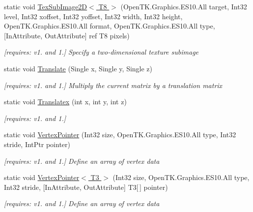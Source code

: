 \begin{DoxyCompactItemize}
static void \hyperlink{class_open_t_k_1_1_graphics_1_1_e_s10_1_1_g_l_a444f65140e204990399aab9eff034486}{Tex\-Sub\-Image2\-D$<$ T8 $>$} (Open\-T\-K.\-Graphics.\-E\-S10.\-All target, Int32 level, Int32 xoffset, Int32 yoffset, Int32 width, Int32 height, Open\-T\-K.\-Graphics.\-E\-S10.\-All format, Open\-T\-K.\-Graphics.\-E\-S10.\-All type, \mbox{[}In\-Attribute, Out\-Attribute\mbox{]} ref T8 pixels)
\begin{DoxyCompactList}\small\item\em \mbox{[}requires\-: v1. and 1.\mbox{]} Specify a two-\/dimensional texture subimage \end{DoxyCompactList}\item 
static void \hyperlink{class_open_t_k_1_1_graphics_1_1_e_s10_1_1_g_l_a11d8e3265a9b0335314f22ae83245a84}{Translate} (Single x, Single y, Single z)
\begin{DoxyCompactList}\small\item\em \mbox{[}requires\-: v1. and 1.\mbox{]} Multiply the current matrix by a translation matrix \end{DoxyCompactList}\item 
static void \hyperlink{class_open_t_k_1_1_graphics_1_1_e_s10_1_1_g_l_adb0a61145bd0441be800712364a9a890}{Translatex} (int x, int y, int z)
\begin{DoxyCompactList}\small\item\em \mbox{[}requires\-: v1. and 1.\mbox{]}\end{DoxyCompactList}\item 
static void \hyperlink{class_open_t_k_1_1_graphics_1_1_e_s10_1_1_g_l_a104dcc16747eef9d0e41468905287c95}{Vertex\-Pointer} (Int32 size, Open\-T\-K.\-Graphics.\-E\-S10.\-All type, Int32 stride, Int\-Ptr pointer)
\begin{DoxyCompactList}\small\item\em \mbox{[}requires\-: v1. and 1.\mbox{]} Define an array of vertex data \end{DoxyCompactList}\item 
static void \hyperlink{class_open_t_k_1_1_graphics_1_1_e_s10_1_1_g_l_a610638d7045d41af92eff1d866edc6c0}{Vertex\-Pointer$<$ T3 $>$} (Int32 size, Open\-T\-K.\-Graphics.\-E\-S10.\-All type, Int32 stride, \mbox{[}In\-Attribute, Out\-Attribute\mbox{]} T3\mbox{[}$\,$\mbox{]} pointer)
\begin{DoxyCompactList}\small\item\em \mbox{[}requires\-: v1. and 1.\mbox{]} Define an array of vertex data \end{DoxyCompactList}\item 

\end{DoxyCompactItemize}
